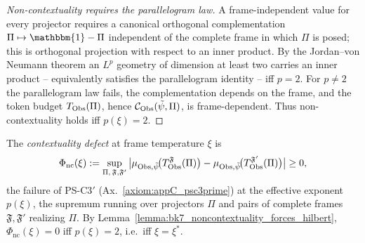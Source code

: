 \begin{proof}[Non-contextuality requires the parallelogram law]
\label{proof:bk7_noncontextuality_forces_hilbert}
\leavevmode
A frame-independent value for every projector requires a canonical orthogonal
complementation $\Pi \mapsto \mathbbm{1}-\Pi$ independent of the complete frame in
which $\Pi$ is posed; this is orthogonal projection with respect to an inner product.
By the Jordan--von Neumann theorem an $L^{p}$ geometry of dimension at least two
carries an inner product -- equivalently satisfies the parallelogram identity --
iff $p=2$. For $p\neq2$ the parallelogram law fails, the complementation depends on
the frame, and the token budget $T_{\mathrm{Obs}}(\Pi)$, hence
$\mathcal{C}_{\mathrm{Obs}}(\tilde\psi,\Pi)$, is frame-dependent. Thus non-contextuality holds
iff $p(\xi)=2$.
\end{proof}

\begin{definition}
\label{definition:bk7_contextuality_defect}
The \emph{contextuality defect} at frame temperature $\xi$ is
\[
\Phi_{\mathrm{nc}}(\xi) := \sup_{\Pi,\,\mathfrak{F},\mathfrak{F}'}
\big| \mu_{\mathrm{Obs},\tilde\psi}\!\big(T^{\mathfrak{F}}_{\mathrm{Obs}}(\Pi)\big)
- \mu_{\mathrm{Obs},\tilde\psi}\!\big(T^{\mathfrak{F}'}_{\mathrm{Obs}}(\Pi)\big) \big| \ge 0,
\]
the failure of PS-C3$'$ (Ax.~\ref{axiom:appC_psc3prime}) at the effective exponent
$p(\xi)$, the supremum running over projectors $\Pi$ and pairs of complete frames
$\mathfrak{F},\mathfrak{F}'$ realizing $\Pi$. By
Lemma~\ref{lemma:bk7_noncontextuality_forces_hilbert}, $\Phi_{\mathrm{nc}}(\xi)=0$ iff
$p(\xi)=2$, i.e.\ iff $\xi=\xi^{\ast}$.
\end{definition}

